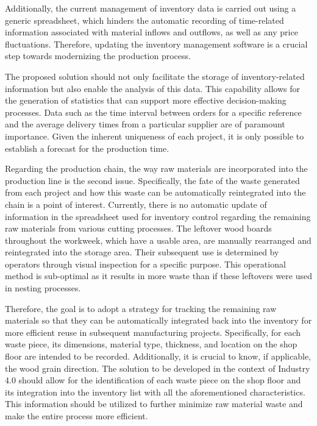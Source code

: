 Additionally, the current management of inventory data is carried out using a generic spreadsheet, which hinders the automatic recording of time-related information associated with material inflows and outflows, as well as any price fluctuations. Therefore, updating the inventory management software is a crucial step towards modernizing the production process.

The proposed solution should not only facilitate the storage of inventory-related information but also enable the analysis of this data. This capability allows for the generation of statistics that can support more effective decision-making processes. Data such as the time interval between orders for a specific reference and the average delivery times from a particular supplier are of paramount importance. Given the inherent uniqueness of each project, it is only possible to establish a forecast for the production time. 

Regarding the production chain, the way raw materials are incorporated into the production line is the second issue. Specifically, the fate of the waste generated from each project and how this waste can be automatically reintegrated into the chain is a point of interest. Currently, there is no automatic update of information in the spreadsheet used for inventory control regarding the remaining raw materials from various cutting processes. The leftover wood boards throughout the workweek, which have a usable area, are manually rearranged and reintegrated into the storage area. Their subsequent use is determined by operators through visual inspection for a specific purpose. This operational method is sub-optimal as it results in more waste than if these leftovers were used in nesting processes.

Therefore, the goal is to adopt a strategy for tracking the remaining raw materials so that they can be automatically integrated back into the inventory for more efficient reuse in subsequent manufacturing projects. Specifically, for each waste piece, its dimensions, material type, thickness, and location on the shop floor are intended to be recorded. Additionally, it is crucial to know, if applicable, the wood grain direction. The solution to be developed in the context of Industry 4.0 should allow for the identification of each waste piece on the shop floor and its integration into the inventory list with all the aforementioned characteristics. This information should be utilized to further minimize raw material waste and make the entire process more efficient.


